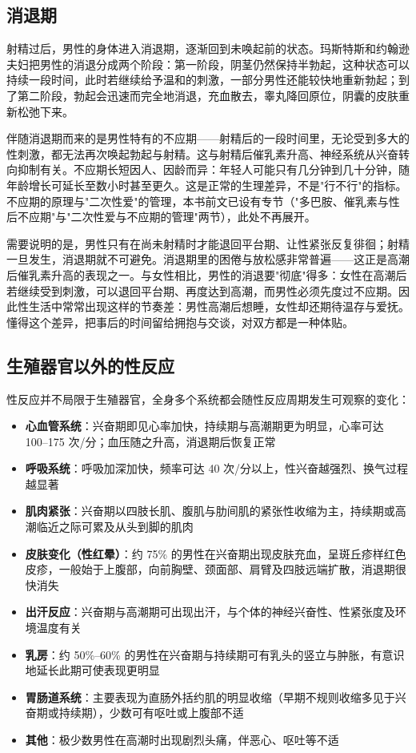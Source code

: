\documentclass[12pt,a4paper,twoside]{ctexbook}
\begin{document}
\subsection{消退期}

射精过后，男性的身体进入消退期，逐渐回到未唤起前的状态。玛斯特斯和约翰逊夫妇把男性的消退分成两个阶段：第一阶段，阴茎仍然保持半勃起，这种状态可以持续一段时间，此时若继续给予温和的刺激，一部分男性还能较快地重新勃起；到了第二阶段，勃起会迅速而完全地消退，充血散去，睾丸降回原位，阴囊的皮肤重新松弛下来。

伴随消退期而来的是男性特有的不应期——射精后的一段时间里，无论受到多大的性刺激，都无法再次唤起勃起与射精。这与射精后催乳素升高、神经系统从兴奋转向抑制有关。不应期长短因人、因龄而异：年轻人可能只有几分钟到几十分钟，随年龄增长可延长至数小时甚至更久。这是正常的生理差异，不是"行不行"的指标。不应期的原理与"二次性爱"的管理，本书前文已设有专节（"多巴胺、催乳素与性后不应期"与"二次性爱与不应期的管理"两节），此处不再展开。

需要说明的是，男性只有在尚未射精时才能退回平台期、让性紧张反复徘徊；射精一旦发生，消退期就不可避免。消退期里的困倦与放松感非常普遍——这正是高潮后催乳素升高的表现之一。与女性相比，男性的消退要"彻底"得多：女性在高潮后若继续受到刺激，可以退回平台期、再度达到高潮，而男性必须先度过不应期。因此性生活中常常出现这样的节奏差：男性高潮后想睡，女性却还期待温存与爱抚。懂得这个差异，把事后的时间留给拥抱与交谈，对双方都是一种体贴。

\subsection{生殖器官以外的性反应}

性反应并不局限于生殖器官，全身多个系统都会随性反应周期发生可观察的变化：

\begin{itemize}
	\item \textbf{心血管系统}：兴奋期即见心率加快，持续期与高潮期更为明显，心率可达 100--175 次/分；血压随之升高，消退期后恢复正常
	\item \textbf{呼吸系统}：呼吸加深加快，频率可达 40 次/分以上，性兴奋越强烈、换气过程越显著
	\item \textbf{肌肉紧张}：兴奋期以四肢长肌、腹肌与肋间肌的紧张性收缩为主，持续期或高潮临近之际可累及从头到脚的肌肉
	\item \textbf{皮肤变化（性红晕）}：约 75\% 的男性在兴奋期出现皮肤充血，呈斑丘疹样红色皮疹，一般始于上腹部，向前胸壁、颈面部、肩臂及四肢远端扩散，消退期很快消失
	\item \textbf{出汗反应}：兴奋期与高潮期可出现出汗，与个体的神经兴奋性、性紧张度及环境温度有关
	\item \textbf{乳房}：约 50\%--60\% 的男性在兴奋期与持续期可有乳头的竖立与肿胀，有意识地延长此期可使表现更明显
	\item \textbf{胃肠道系统}：主要表现为直肠外括约肌的明显收缩（早期不规则收缩多见于兴奋期或持续期），少数可有呕吐或上腹部不适
	\item \textbf{其他}：极少数男性在高潮时出现剧烈头痛，伴恶心、呕吐等不适
\end{itemize}
\end{document}
